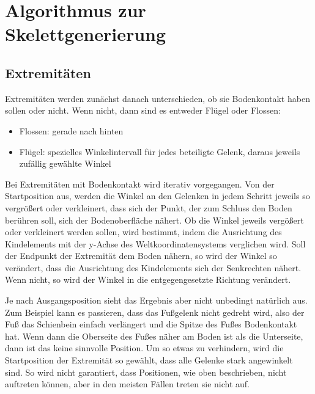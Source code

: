 \chapter{Algorithmus zur Skelettgenerierung}

\section{Extremitäten}

Extremitäten werden zunächst danach unterschieden, ob sie Bodenkontakt haben sollen oder nicht.
Wenn nicht, dann sind es entweder Flügel oder Flossen: 

\begin{itemize}
 \item Flossen: gerade nach hinten 
 \item Flügel: spezielles Winkelintervall für jedes beteiligte Gelenk, daraus jeweils zufällig gewählte Winkel 
\end{itemize}

Bei Extremitäten mit Bodenkontakt wird iterativ vorgegangen. 
Von der Startposition aus, werden die Winkel an den Gelenken in jedem Schritt jeweils so vergrößert oder verkleinert, dass sich der Punkt, der zum Schluss den Boden berühren soll, sich der Bodenoberfläche nähert. Ob die Winkel jeweils vergößert oder verkleinert werden sollen, wird bestimmt, indem die Ausrichtung des Kindelements mit der y-Achse des Weltkoordinatensystems verglichen wird. Soll der Endpunkt der Extremität dem Boden nähern, so wird der Winkel so verändert, dass die Ausrichtung des Kindelements sich der Senkrechten nähert. Wenn nicht, so wird der Winkel in die entgegengesetzte Richtung verändert.

Je nach Ausgangsposition sieht das Ergebnis aber nicht unbedingt natürlich aus. Zum Beispiel kann es passieren, dass das Fußgelenk nicht gedreht wird, also der Fuß das Schienbein einfach verlängert und die Spitze des Fußes Bodenkontakt hat. Wenn dann die Oberseite des Fußes näher am Boden ist als die Unterseite, dann ist das keine sinnvolle Position.
Um so etwas zu verhindern, wird die Startposition der Extremität so gewählt, dass alle Gelenke stark angewinkelt sind. 
So wird nicht garantiert, dass Positionen, wie oben beschrieben, nicht auftreten können, aber in den meisten Fällen treten sie nicht auf.

